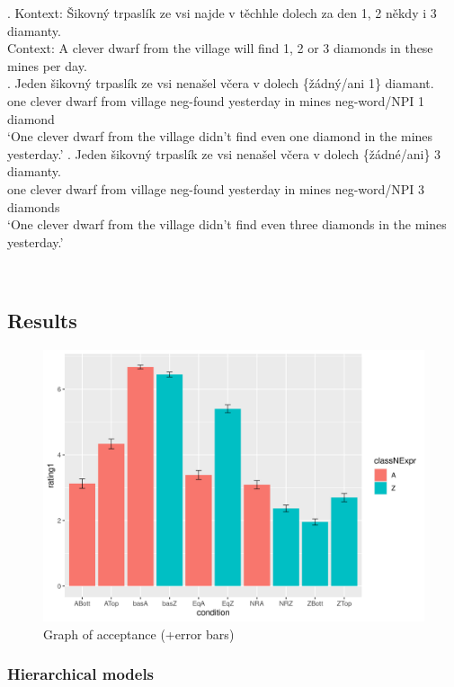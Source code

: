 \documentclass[
  letterpaper,
  DIV=11,
  numbers=noendperiod]{scrartcl}
\begin{document}
\ex. Kontext: Šikovný trpaslík ze vsi najde v těchhle dolech za den 1, 2
někdy i 3 diamanty.\\
Context: A clever dwarf from the village will find 1, 2 or 3 diamonds in
these mines per day.\\
\ag. Jeden šikovný trpaslík ze vsi nenašel včera v dolech \{žádný/ani
1\} diamant.\\
one clever dwarf from village neg-found yesterday in mines neg-word/NPI
1 diamond\\
`One clever dwarf from the village didn't find even one diamond in the
mines yesterday.' \bg. Jeden šikovný trpaslík ze vsi nenašel včera v
dolech \{žádné/ani\} 3 diamanty.\\
one clever dwarf from village neg-found yesterday in mines neg-word/NPI
3 diamonds\\
`One clever dwarf from the village didn't find even three diamonds in
the mines yesterday.'

~

\hypertarget{results}{%
\subsection{Results}\label{results}}

\begin{figure}

{\centering \includegraphics{"error_bar.png"}

}

\caption{Graph of acceptance (+error bars)}

\end{figure}

\hypertarget{hierarchical-models}{%
\subsubsection{Hierarchical models}\label{hierarchical-models}}
\end{document}
